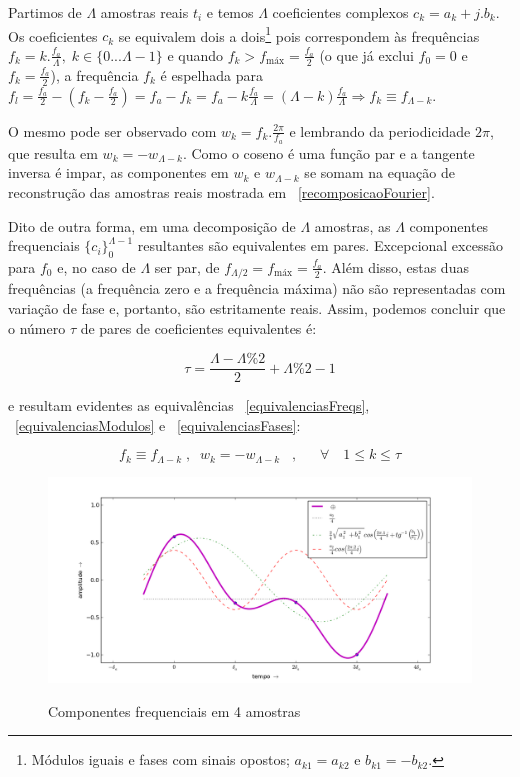 Partimos de $\Lambda$ amostras reais $t_i$ e temos $\Lambda$ coeficientes complexos $c_k=a_k+j.b_k$. Os coeficientes $c_k$ se equivalem dois a dois\footnote{Módulos iguais e fases com sinais opostos; $a_{k1}=a_{k2}$ e $b_{k1}=-b_{k2}$.} pois correspondem às frequências $f_k = k.\frac{f_a}{\Lambda}, \; k \in \{0...\Lambda-1\} $
 e quando $ f_k > f_{\text{máx}} = \frac{f_a}{2} $ (o que já exclui $f_0=0$ e $f_k=\frac{f_a}{2}$), a frequência $f_k$ é espelhada para $f_l=\frac{f_a}{2} - (f_k-\frac{f_a}{2})=f_a-f_k=f_a - k\frac{f_a}{\Lambda}=(\Lambda-k)\frac{f_a}{\Lambda} \Rightarrow f_k\equiv f_{\Lambda-k}$. 
 
 O mesmo pode ser observado com 
 $w_k=f_k.\frac{2\pi}{f_a}$ e lembrando da periodicidade $2\pi$, que resulta em $w_k=-w_{\Lambda-k}$. Como o coseno é uma função par e a tangente inversa é impar, as componentes em $w_k$ e $w_{\Lambda-k}$ se somam na equação de reconstrução das amostras reais mostrada em ~\ref{recomposicaoFourier}.

  Dito de outra forma, em uma decomposição de $\Lambda$ amostras, as $\Lambda$ componentes frequenciais $\{c_i\}_0^{\Lambda-1}$ resultantes
   são equivalentes em pares.
   Excepcional excessão para $f_0$ e, no caso de $\Lambda$ ser par, de $f_{\Lambda/2}=f_{\text{máx}}=\frac{f_a}{2}$. Além disso, estas duas frequências (a frequência zero e a frequência máxima) não são representadas com variação de fase e, portanto, são estritamente reais. Assim, podemos 
   concluir que o número $\tau$ de pares de coeficientes equivalentes é:

\begin{equation}\label{coefsPareados}
\tau = \frac{\Lambda - \Lambda \% 2}{2} +\Lambda \% 2 -1
\end{equation}

e resultam evidentes as equivalências ~\ref{equivalenciasFreqs}, ~\ref{equivalenciasModulos} e ~\ref{equivalenciasFases}:

\begin{equation}\label{equivalenciasFreqs}
f_{k}\equiv f_{\Lambda-k}\;, \;\; w_{k}=-w_{\Lambda-k}\;\;\;, \quad \;\; \forall \quad 1 \leq k \leq \tau  
\end{equation}

\begin{figure}[h!]
    \centering
    \caption{Componentes frequenciais em 4 amostras}
        \includegraphics[width=\textwidth]{figuras/amostras4__}
        \label{fig:amostras4}
\end{figure}


